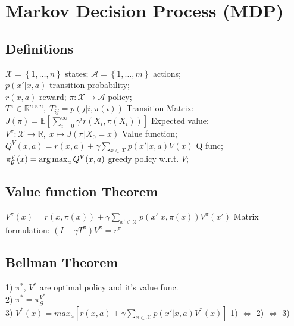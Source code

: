 \section{Markov Decision Process (MDP)}
\subsection{Definitions}
$\mathcal{X}=\left\{1,\dots,n\right\}$ states; 
$\mathcal{A}=\left\{1,\dots,m\right\}$ actions;\\
$p(x'\vert x, a)$ transition probability;\\
$r(x,a)$ reward; 
$\pi:\mathcal{X}\rightarrow\mathcal{A}$ policy;\\
$T^\pi\in\mathbb{R}^{n\times n},\; T^\pi_{ij} = p(j\vert i, \pi(i))$ Transition Matrix:\\
$J(\pi) = \mathbb{E}\left[\sum_{i=0}^{\infty}\gamma^i r(X_i, \pi(X_i))\right]$ Expected value:\\
$V^\pi:\mathcal{X}\rightarrow \mathbb{R},\; x\mapsto J(\pi\vert X_0 = x)$ Value function;\\
$Q^V(x,a) = r(x,a) + \gamma\sum_{x\in\mathcal{X}}p(x'\vert x, a)V(x)$ Q func;\\
$\pi_\mathcal{G}^{V}(x)=\operatorname*{arg\,max}_a Q^V(x,a)$ greedy policy {\scriptsize w.r.t. $V$};

\subsection{Value function Theorem}
$V^\pi(x) = r(x,\pi(x))+\gamma\sum_{x'\in\mathcal{X}}p(x'\vert x, \pi(x))V^\pi(x')$
Matrix formulation: $(I-\gamma T^\pi)V^\pi=r^\pi$

\subsection{Bellman Theorem}
1) $\pi^*$, $V^*$ are optimal policy and it's value func.\\
2) $\pi^* = \pi_\mathcal{G}^{V^*}$\\
3) $V^*(x)=max_a\left[r(x,a)+\gamma\sum_{x\in\mathcal{X}}p(x'\vert x, a)V^*(x)\right]$
1) $\Leftrightarrow$ 2) $\Leftrightarrow$ 3)
